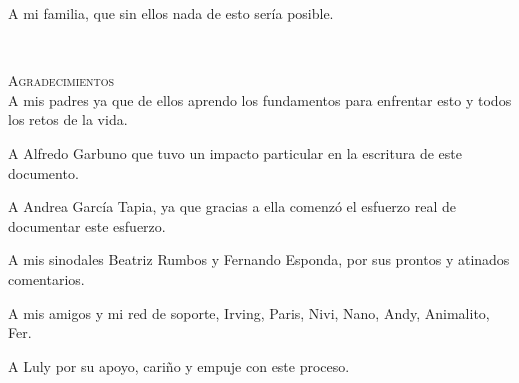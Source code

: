\newpage
\vspace*{\fill}
\begin{flushright}
A mi familia, que sin ellos nada de esto sería posible.
\vfill
\end{flushright}
\newpage
\mbox{ }
\vspace{80pt}
\begin{flushright}
\textsc{\large Agradecimientos} \\
\vspace{12pt}
A mis padres ya que de ellos aprendo los fundamentos para enfrentar esto y todos los retos de la vida.

A Alfredo Garbuno que tuvo un impacto particular en la escritura de este documento.

A Andrea García Tapia, ya que gracias a ella comenzó el esfuerzo real de documentar este esfuerzo.

A mis sinodales Beatriz Rumbos y Fernando Esponda, por sus prontos y atinados comentarios.

A mis amigos y mi red de soporte, Irving, Paris, Nivi, Nano, Andy, Animalito, Fer.

A Luly por su apoyo, cariño y empuje con este proceso.

\end{flushright}
\newpage
